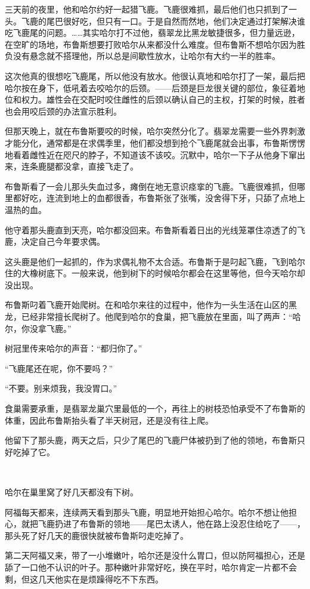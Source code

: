 \documentclass[../main.tex]{subfiles}
\begin{document}
三天前的夜里，他和哈尔约好一起猎飞鹿。飞鹿很难抓，最后他们也只抓到了一头。飞鹿的尾巴很好吃，但只有一口。于是自然而然地，他们决定通过打架解决谁吃飞鹿尾的问题。……其实哈尔打不过他，翡翠龙比黑龙敏捷很多，但力量远逊，在空旷的场地，布鲁斯想要打败哈尔从来都没什么难度。但布鲁斯不想哈尔因为胜负没有悬念就不搭理他，所以总是间歇性放水，让哈尔有大约一半的胜率。

这次他真的很想吃飞鹿尾，所以他没有放水。他很认真地和哈尔打了一架，最后把哈尔按在身下，低吼着去咬哈尔的后颈。——后颈是巨龙很关键的部位，象征着地位和权力。雄性会在交配时咬住雌性的后颈以确认自己的主权，打架的时候，胜者也会用咬后颈的办法宣示胜利。

但那天晚上，就在布鲁斯要咬的时候，哈尔突然分化了。翡翠龙需要一些外界刺激才能分化，通常都是在求偶季里，他们都没想到抢个飞鹿尾就会出事，布鲁斯愣愣地看着雌性近在咫尺的脖子，不知道该不该咬。沉默中，哈尔一下子从他身下窜出来，连条鹿腿都没拿，直接飞走了。

布鲁斯看了一会儿那头失血过多，瘫倒在地无意识痉挛的飞鹿。飞鹿很难抓，但哪里都好吃，连流到地上的血都很香，布鲁斯张了张嘴，没舍得下牙，只舔了点地上温热的血。

他守着那头鹿直到天亮，哈尔都没回来。布鲁斯看着日出的光线笼罩住凉透了的飞鹿，决定自己今年要求偶。

这头鹿是他们一起抓的，作为求偶礼物不太合适。布鲁斯于是叼起飞鹿，飞到哈尔住的大橡树底下。一般来说，他到树下的时候哈尔都会在这里等他，但今天哈尔却没出现。

布鲁斯叼着飞鹿开始爬树。在和哈尔来往的过程中，他作为一头生活在山区的黑龙，已经非常擅长爬树了。他爬到哈尔的食巢，把飞鹿放在里面，叫了两声：“哈尔，你没拿飞鹿。”

树冠里传来哈尔的声音：“都归你了。”

“飞鹿尾还在呢，你不要吗？”

“不要。别来烦我，我没胃口。”

食巢需要承重，是翡翠龙巢穴里最低的一个，再往上的树枝恐怕承受不了布鲁斯的体重，因此布鲁斯抬头看了半天树冠，还是没有往上爬。

他留下了那头鹿，两天之后，只少了尾巴的飞鹿尸体被扔到了他的领地，布鲁斯只好吃掉了它。

~\

哈尔在巢里窝了好几天都没有下树。

阿福每天都来，连续两天看到那头飞鹿，明显地开始担心哈尔。哈尔不想让他担心，就把飞鹿扔进了布鲁斯的领地——尾巴太诱人，他在路上没忍住给吃了——，那头死了好几天的鹿很快就被布鲁斯叼走吃掉了。

第二天阿福又来，带了一小堆嫩叶，哈尔还是没什么胃口，但以防阿福担心，还是舔了一口他不认识的叶子。那种嫩叶非常好吃，换在平时，哈尔肯定一片都不会剩，但这几天他实在是烦躁得吃不下东西。
\end{document}
